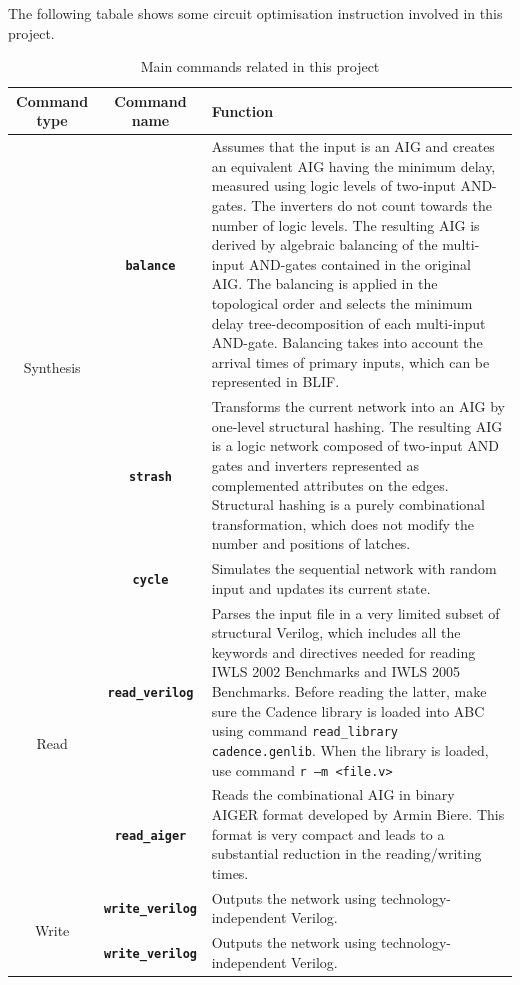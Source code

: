 The following tabale shows some circuit optimisation instruction involved in this project.
\begin{table}[!htbp]
    \centering
    \begin{tabular}{c|c|m{8cm}}
        \hline
       Command type & Command name & Function\\
        \hline
     \multirow{3}{*}{Synthesis}&\textbf{\texttt{balance}} & Assumes that the input is an AIG and creates an equivalent AIG having the minimum delay, measured using logic levels of two-input AND-gates. The inverters do not count towards the number of logic levels. The resulting AIG is derived by algebraic balancing of the multi-input AND-gates contained in the original AIG. The balancing is applied in the topological order and selects the minimum delay tree-decomposition of each multi-input AND-gate. Balancing takes into account the arrival times of primary inputs, which can be represented in BLIF.\\
     \cline{2-3}
     & \textbf{\texttt{strash}}&Transforms the current network into an AIG by one-level structural hashing. The resulting AIG is a logic network composed of two-input AND gates and inverters represented as complemented attributes on the edges. Structural hashing is a purely combinational transformation, which does not modify the number and positions of latches.\\
     \cline{2-3}
     & \textbf{\texttt{cycle}}&Simulates the sequential network with random input and updates its current state.\\
     \hline
     \multirow{2}{*}{Read}&\textbf{\texttt{read\_verilog}}&Parses the input file in a very limited subset of structural Verilog, which includes all the keywords and directives needed for reading IWLS 2002 Benchmarks and  IWLS 2005 Benchmarks. Before reading the latter, make sure the Cadence library is loaded into ABC using command \texttt{read\_library cadence.genlib}. When the library is loaded, use command \texttt{r –m <file.v>}\\
     \cline{2-3}
     & \textbf{\texttt{read\_aiger}} & Reads the combinational AIG in binary AIGER format developed by Armin Biere. This format is very compact and leads to a substantial reduction in the reading/writing times.\\
     \hline
     \multirow{2}{*}{Write}&\textbf{\texttt{write\_verilog}}& Outputs the network using technology-independent Verilog.\\
     \cline{2-3}
     & \textbf{\texttt{write\_verilog}}& Outputs the network using technology-independent Verilog.\\
     \hline
     
\end{tabular}

    \caption{Main commands related in this project\cite{manual2006quick}}
    \label{tab:my_label}
\end{table}



